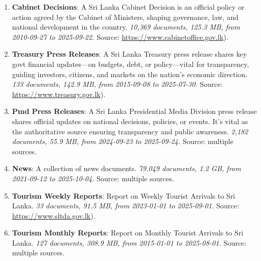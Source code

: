 \documentclass[10pt,a4paper]{article}%
\begin{document}
\begin{enumerate}
\item%
\textbf{Cabinet Decisions}: A Sri Lanka Cabinet Decision is an official policy or action agreed by the Cabinet of Ministers, shaping governance, law, and national development in the country.\textit{ 10,369 documents, 125.3 MB, from 2010{-}09{-}27 to 2025{-}09{-}22.} Source: \href{https://www.cabinetoffice.gov.lk}{https://www.cabinetoffice.gov.lk}).%
\item%
\textbf{Treasury Press Releases}: A Sri Lanka Treasury press release shares key govt financial updates—on budgets, debt, or policy—vital for transparency, guiding investors, citizens, and markets on the nation’s economic direction.\textit{ 133 documents, 142.9 MB, from 2015{-}09{-}08 to 2025{-}07{-}30.} Source: \href{https://www.treasury.gov.lk}{https://www.treasury.gov.lk}).%
\item%
\textbf{Pmd Press Releases}: A Sri Lanka Presidential Media Division press release shares official updates on national decisions, policies, or events. It’s vital as the authoritative source ensuring transparency and public awareness.\textit{ 2,182 documents, 55.9 MB, from 2024{-}09{-}23 to 2025{-}09{-}24.} Source: multiple sources.%
\item%
\textbf{News}: A collection of news documents.\textit{ 79,049 documents, 1.2 GB, from 2021{-}09{-}12 to 2025{-}10{-}04.} Source: multiple sources.%
\item%
\textbf{Tourism Weekly Reports}: Report on Weekly Tourist Arrivals to Sri Lanka.\textit{ 33 documents, 91.5 MB, from 2023{-}01{-}01 to 2025{-}09{-}01.} Source: \href{https://www.sltda.gov.lk}{https://www.sltda.gov.lk}).%
\item%
\textbf{Tourism Monthly Reports}: Report on Monthly Tourist Arrivals to Sri Lanka.\textit{ 127 documents, 308.9 MB, from 2015{-}01{-}01 to 2025{-}08{-}01.} Source: multiple sources.%
\end{enumerate}

%
\end{document}
